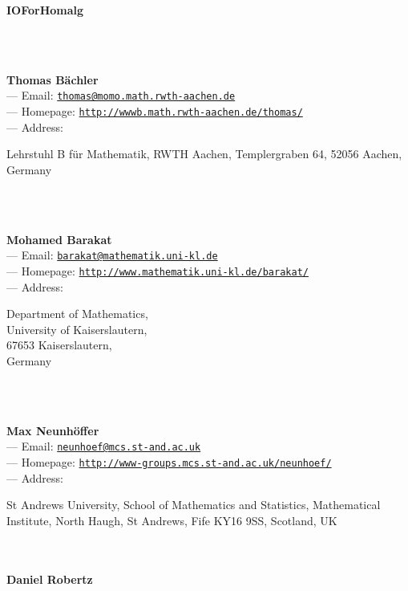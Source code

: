 \documentclass[a4paper,11pt]{report}
\begin{document}
\begin{titlepage}
\begin{center}{\Huge \textbf{\textsf{IO{\textunderscore}ForHomalg}\mbox{}}}
\end{center}\vfill

\mbox{}\\
{\mbox{}\\
\small \noindent \textbf{Thomas B{\"a}chler\\
    } --- Email: \href{mailto://thomas@momo.math.rwth-aachen.de} {\texttt{thomas@momo.math.rwth-aachen.de}}\\
 --- Homepage: \href{http://wwwb.math.rwth-aachen.de/~thomas/} {\texttt{http://wwwb.math.rwth-aachen.de/\texttt{}thomas/}}\\
 --- Address: \begin{minipage}[t]{8cm}\noindent
 Lehrstuhl B f{\"u}r Mathematik, RWTH Aachen, Templergraben 64, 52056 Aachen,
Germany \end{minipage}
}\\
{\mbox{}\\
\small \noindent \textbf{Mohamed Barakat\\
    } --- Email: \href{mailto://barakat@mathematik.uni-kl.de} {\texttt{barakat@mathematik.uni-kl.de}}\\
 --- Homepage: \href{http://www.mathematik.uni-kl.de/~barakat/} {\texttt{http://www.mathematik.uni-kl.de/\texttt{}barakat/}}\\
 --- Address: \begin{minipage}[t]{8cm}\noindent
 Department of Mathematics, \\
 University of Kaiserslautern, \\
 67653 Kaiserslautern, \\
 Germany \end{minipage}
}\\
{\mbox{}\\
\small \noindent \textbf{Max Neunh{\"o}ffer\\
    } --- Email: \href{mailto://neunhoef@mcs.st-and.ac.uk} {\texttt{neunhoef@mcs.st-and.ac.uk}}\\
 --- Homepage: \href{http://www-groups.mcs.st-and.ac.uk/~neunhoef/} {\texttt{http://www-groups.mcs.st-and.ac.uk/\texttt{}neunhoef/}}\\
 --- Address: \begin{minipage}[t]{8cm}\noindent
 St Andrews University, School of Mathematics and Statistics, Mathematical
Institute, North Haugh, St Andrews, Fife KY16 9SS, Scotland, UK \end{minipage}
}\\
{\mbox{}\\
\small \noindent \textbf{Daniel Robertz\\
}}
\end{titlepage}
\end{document}
